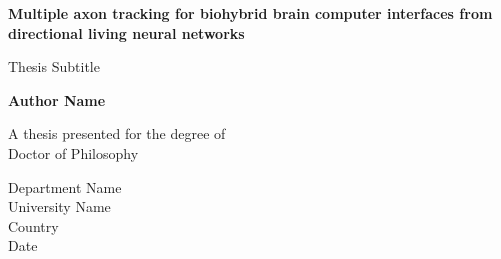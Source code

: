 \begin{titlepage}
    \begin{center}
        \vspace*{1cm}
        
        \Huge
        \textbf{Multiple axon tracking for biohybrid brain computer interfaces
        from directional living neural networks}
        
        \vspace{0.5cm}
        \LARGE
        Thesis Subtitle
        
        \vspace{1.5cm}
        
        \textbf{Author Name}
        
        \vfill
        
        A thesis presented for the degree of\\
        Doctor of Philosophy
        
        \vspace{0.8cm}
        
        \Large
        Department Name\\
        University Name\\
        Country\\
        Date
        
    \end{center}
\end{titlepage}